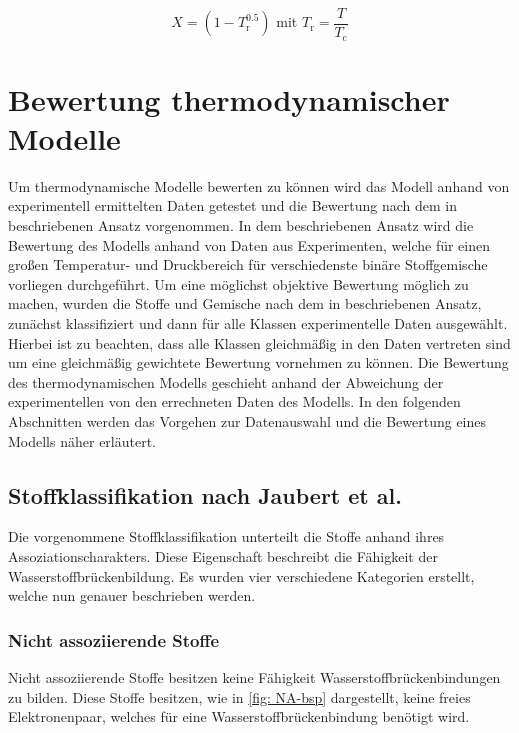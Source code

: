 \documentclass[../thesis.tex]{subfiles}
\begin{document}
\begin{equation}
	X = \left( 1 - T_\mathrm{r}^{0\text{.}5} \right) \text{ mit } T_\mathrm{r} = \dfrac{T}{T_\mathrm{c}}
	\label{eq: a_i_sup}
\end{equation}

\section{Bewertung thermodynamischer Modelle}

Um thermodynamische Modelle bewerten zu können wird das Modell anhand von experimentell ermittelten Daten getestet und die Bewertung nach dem in \cite{jaubert2020benchmark} beschriebenen Ansatz vorgenommen. In dem beschriebenen Ansatz wird die Bewertung des Modells anhand von Daten aus Experimenten, welche für einen großen Temperatur- und Druckbereich für verschiedenste binäre Stoffgemische vorliegen durchgeführt. Um eine möglichst objektive Bewertung möglich zu machen, wurden die Stoffe und Gemische nach dem in \cite{jaubert2020benchmark} beschriebenen Ansatz, zunächst klassifiziert und dann für alle Klassen experimentelle Daten ausgewählt. Hierbei ist zu beachten, dass alle Klassen gleichmäßig in den Daten vertreten sind um eine gleichmäßig gewichtete Bewertung vornehmen zu können.
Die Bewertung des thermodynamischen Modells geschieht anhand der Abweichung der experimentellen von den errechneten Daten des Modells.
In den folgenden Abschnitten werden das Vorgehen zur Datenauswahl und die Bewertung eines Modells näher erläutert.

\subsection{Stoffklassifikation nach Jaubert et al.}
\label{sec: klassifikation}

Die vorgenommene Stoffklassifikation unterteilt die Stoffe anhand ihres Assoziationscharakters. Diese Eigenschaft beschreibt die Fähigkeit der Wasserstoffbrückenbildung. Es wurden vier verschiedene Kategorien erstellt, welche nun genauer beschrieben werden.

\subsubsection{Nicht assoziierende Stoffe}

Nicht assoziierende Stoffe besitzen keine Fähigkeit Wasserstoffbrückenbindungen zu bilden. Diese Stoffe besitzen, wie in \autoref{fig: NA-bsp} dargestellt, keine freies Elektronenpaar, welches für eine Wasserstoffbrückenbindung benötigt wird.
\end{document}
